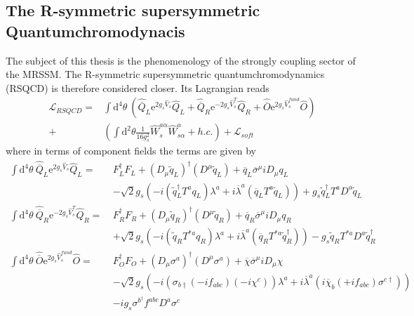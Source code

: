 \subsection{The R-symmetric supersymmetric Quantumchromodynacis}
The subject of this thesis is the phenomenology of the strongly coupling sector of the MRSSM. The R-symmetric supersymmetric quantumchromodynamics (RSQCD) is therefore considered closer. Its Lagrangian reads
\begin{align}
\mathcal{L}_{RSQCD} = &\int\mathrm{d}^4\theta\ \left( \hat{\overline{Q}}_L \mathrm{e}^{2g_s\hat{V}_s} \hat{Q}_L + \hat{\overline{Q}}_R \mathrm{e}^{-2g_s\hat{V}^T_s} \hat{Q}_R + \hat{\overline{O}} \mathrm{e}^{2g_s\hat{V}^{fund}_s} \hat{O}\right)\nonumber\\
+& \left( \int \mathrm{d}^2\theta \frac{1}{16g_s^2} \hat{W}_s^{a\alpha}\hat{W}^a_{s\alpha} + h.c. \right) + \mathcal{L}_{soft}
\end{align}
where in terms of component fields the terms are given by
\begin{align}
\int\mathrm{d}^4\theta\ \hat{\overline{Q}}_L \mathrm{e}^{2g_s\hat{V}_s} \hat{Q}_L =\ & F_L^\dagger F_L + (D_\mu \tilde{q}_L)^\dagger (D^\mu \tilde{q}_L) + \overline{q}_L \overline{\sigma}^\mu i D_\mu q_L\nonumber\\
&-\sqrt{2}g_s \left( -i (\tilde{q}_L^\dagger T^a q_L ) \lambda^a + i \overline{\lambda}^a (\overline{q}_L T^a \tilde{q}_L) \right) + g_s\tilde{q}_L^\dagger T^a D^a \tilde{q}_L\label{eq:RSQCD_Feynmanrules1}\\
\int\mathrm{d}^4\theta\ \hat{\overline{Q}}_R \mathrm{e}^{-2g_s\hat{V}^T_s} \hat{Q}_R =\  & F_R^\dagger F_R + (D_\mu \tilde{q}_R)^\dagger (D^\mu \tilde{q}_R) + \overline{q}_R \overline{\sigma}^\mu i D_\mu q_R\nonumber\\
&+\sqrt{2}g_s \left( -i (\tilde{q}_R T^{\ast a} q_R ) \lambda^a + i \overline{\lambda}^a (\overline{q}_R T^{\ast a} \tilde{q}_R^\dagger) \right) - g_s \tilde{q}_R T^{\ast a} D^a \tilde{q}_R^\dagger\label{eq:RSQCD_Feynmanrules2}\\
\int\mathrm{d}^4\theta\ \hat{\overline{O}} \mathrm{e}^{2g_s\hat{V}^{fund}_s} \hat{O} =\  & F_O^\dagger F_O + (D_\mu \sigma^a)^\dagger (D^\mu \sigma^a) + \overline{\chi} \overline{\sigma}^\mu i D_\mu \chi\nonumber\\
&-\sqrt{2}g_s \left( -i (\sigma_{b\dagger} (-if_{abc}) (-i\chi^c) ) \lambda^a + i \overline{\lambda}^a (i\overline{\chi}_b (+if_{abc}) \sigma^{c\dagger}) \right)\nonumber\\
&-ig_s\sigma^{b^\dagger} f^{abc}D^a\sigma^c
\end{align}
